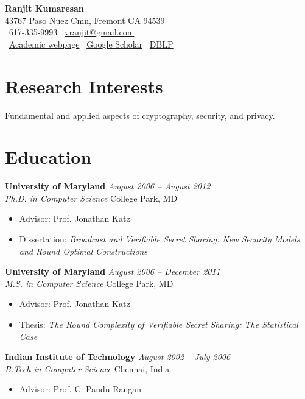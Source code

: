 \documentclass[11pt]{article}
\newcommand{\entry}[4]{
    \vspace{1.5mm}
    \noindent\textbf{#1} \hfill \textit{#2} \\
    \noindent\textit{#3} \hfill #4 \\
}
\begin{document}
\begin{center}
    \Huge\textbf{Ranjit Kumaresan} \\
    \vspace{2mm}
    \normalsize
    43767 Paso Nuez Cmn, Fremont CA 94539 \\
    \faPhone\ 617-335-9993 \quad \faEnvelope\ \href{mailto:vranjit@gmail.com}{vranjit@gmail.com} \\
    \faGlobe\ \href{http://people.csail.mit.edu/ranjit/}{Academic webpage} \quad
    \faGoogle\ \href{https://scholar.google.com/citations?user=YC3Ab4oAAAAJ&hl=en}{Google Scholar} \quad
    \faDatabase\ \href{https://dblp.org/pid/14/4245.html}{DBLP}
\end{center}

\vspace{-2mm}

\section{Research Interests}
Fundamental and applied aspects of cryptography, security, and privacy.

\section{Education}
\entry{University of Maryland}{August 2006 – August 2012}{Ph.D. in Computer Science}{College Park, MD}
\begin{itemize}[leftmargin=*, noitemsep]
    \item Advisor: Prof. Jonathan Katz
    \item Dissertation: \textit{Broadcast and Verifiable Secret Sharing: New Security Models and Round Optimal Constructions}
\end{itemize}

\entry{University of Maryland}{August 2006 – December 2011}{M.S. in Computer Science}{College Park, MD}
\begin{itemize}[leftmargin=*, noitemsep]
    \item Advisor: Prof. Jonathan Katz
    \item Thesis: \textit{The Round Complexity of Verifiable Secret Sharing: The Statistical Case}
\end{itemize}

\entry{Indian Institute of Technology}{August 2002 – July 2006}{B.Tech in Computer Science}{Chennai, India}
\begin{itemize}[leftmargin=*, noitemsep]
    \item Advisor: Prof. C. Pandu Rangan
\end{itemize}
\end{document}
